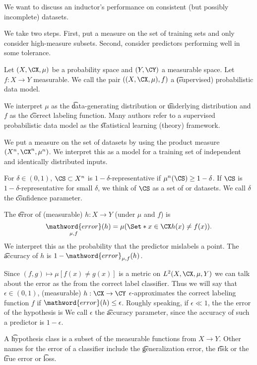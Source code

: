 

We want to discuss an inductor's performance on consistent (but possibly incomplete) datasets.

We take two steps. First, put a measure on the set of training sets and only consider high-measure subsets.
Second, consider predictors performing well in some tolerance.


Let $(X, \CX, \mu)$ be a probability space and $(Y, \CY)$ a measurable space.
Let $f: X \to Y$ measurable.
We call the pair $((X, \CX, \mu), f)$ a \t{(supervised) probabilistic data model}.

We interpret $\mu$ as the \t{data-generating distribution} or \t{underlying distribution} and $f$ as the \t{correct labeling function}.
Many authors refer to a supervised probabilistic data model as the \t{statistical learning (theory) framework}.


We put a measure on the set of datasets by using the product measure $(X^n, \CX^n, \mu^n)$.
We interpret this as a model for a training set of independent and identically distributed inputs.


For $\delta \in (0, 1)$, $\CS \subset X^n$ is \t{$1-\delta$-representative} if $\mu^n(\CS) \geq 1 - \delta$.
If $\CS$ is $1-\delta$-representative for small $\delta$, we think of $\CS$ as a set of  or  datasets.
We call $\delta$ the \t{confidence parameter}.


The \t{error} of (measurable) $h: X \to Y$ (under $\mu$ and $f$) is
\[
  \underset{\mu, f}{\mathword{error}}(h) = \mu(\Set*{x \in \CX}{h(x) \neq f(x)}).
\]
We interpret this as the probability that the predictor mislabels a point.
The \t{accuracy} of $h$ is $1 - \mathword{error}_{\mu, f}(h)$.


Since $(f, g) \mapsto \mu[f(x) \neq g(x)]$ is a metric on $L^2(X, \CX, \mu, Y)$ we can talk about the error as the  from the correct label classifier.
Thus we will say that $\epsilon \in (0, 1)$, (measurable) $h: \CX \to \CY$ \t{$\epsilon$-approximates} the correct labeling function $f$ if $\mathword{error}(h) \leq \epsilon$.
Roughly speaking, if $\epsilon \ll 1$, the the error of the hypothesis is 
We call $\epsilon$ the \t{accuracy parameter}, since the accuracy of such a predictor is $1 - \epsilon$.


A \t{hypothesis class} is a subset of the measurable functions from $X \to Y$.
Other names for the error of a classifier include the \t{generalization error}, the \t{risk} or the \t{true error} or \t{loss}.
